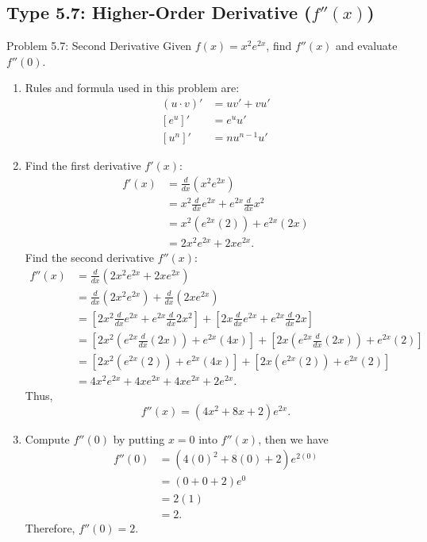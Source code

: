 \documentclass[11pt,a4paper]{article}
\begin{document}
\subsection{Type 5.7: Higher-Order Derivative ($f''(x)$)}
\begin{problembox}{Problem 5.7: Second Derivative}
Given $f(x) = x^2 e^{2x}$, find $f''(x)$ and evaluate $f''(0)$.
\end{problembox}
\begin{solutionbox}
\begin{enumerate}
	\item [Step 1.] Rules and formula used in this problem are:
	\begin{align*}
		(u \cdot v)' &= u v' + v u' \\
		[e^u]' &= e^u u' \\
		[u^n]' &= n u^{n-1} u'
	\end{align*}
	
	\item [Step 2.] Find the first derivative $f'(x)$:
	\begin{align*}
		f'(x) &= \frac{d}{dx} (x^2 e^{2x}) \\
		&= x^2 \frac{d}{dx}e^{2x} + e^{2x} \frac{d}{dx}x^2 \\
		&= x^2(e^{2x}(2)) + e^{2x}(2x) \\
		&= 2x^2 e^{2x} + 2x e^{2x}.
	\end{align*}
	Find the second derivative $f''(x)$:
	\begin{align*}
		f''(x) &= \frac{d}{dx} (2x^2 e^{2x} + 2x e^{2x}) \\
		&= \frac{d}{dx} (2x^2 e^{2x}) + \frac{d}{dx} (2x e^{2x}) \\
		&= \left[ 2x^2 \frac{d}{dx}e^{2x} + e^{2x} \frac{d}{dx}2x^2 \right] + \left[ 2x \frac{d}{dx}e^{2x} + e^{2x} \frac{d}{dx}2x \right] \\
		&= \left[ 2x^2\left(e^{2x}\frac{d}{dx}(2x)\right) + e^{2x}(4x) \right] + \left[ 2x\left(e^{2x}\frac{d}{dx}(2x)\right) + e^{2x}(2) \right] \\
		&= \left[ 2x^2(e^{2x}(2)) + e^{2x}(4x) \right] + \left[ 2x(e^{2x}(2)) + e^{2x}(2) \right] \\
		&= 4x^2 e^{2x} + 4x e^{2x} + 4x e^{2x} + 2 e^{2x}.
	\end{align*}
	Thus,
	\begin{equation*}
		f''(x) = (4x^2 + 8x + 2) e^{2x}.
	\end{equation*}
	
	\item [Step 3.] Compute $f''(0)$ by putting $x = 0$ into $f''(x)$, then we have
	\begin{align*}
		f''(0) &= (4(0)^2 + 8(0) + 2) e^{2(0)} \\
		&= (0 + 0 + 2) e^{0} \\
		&= 2(1) \\
		&= 2.
	\end{align*}
	Therefore, $f''(0) = 2$.
\end{enumerate}
\end{solutionbox}
\end{document}
